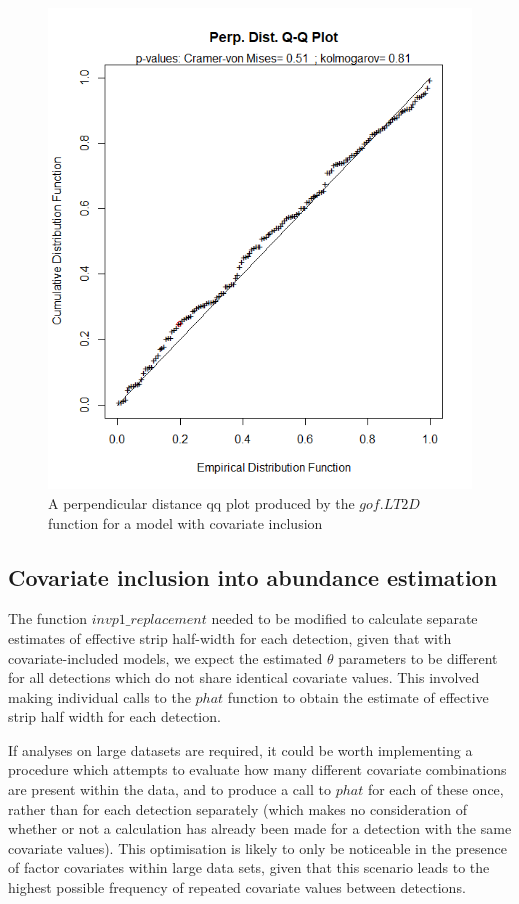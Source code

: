 \documentclass[11pt]{article}
\begin{document}
\begin{multicols}{2}
\begin{figure}[H]
\center
\includegraphics[scale=0.57]{gofx}
\caption{A perpendicular distance qq plot produced by the $gof.LT2D$ function for a model with covariate inclusion}
\end{figure}


\subsection{Covariate inclusion into abundance estimation}
The function $invp1\_replacement$ needed to be modified to calculate separate estimates of effective strip half-width for each detection, given that with covariate-included models, we expect the estimated $\theta$ parameters to be different for all detections which do not share identical covariate values. This involved making individual calls to the $phat$ function to obtain the estimate of effective strip half width for each detection.

If analyses on large datasets are required, it could be worth implementing a procedure which attempts to evaluate how many different covariate combinations are present within the data, and to produce a call to $phat$ for each of these once, rather than for each detection separately (which makes no consideration of whether or not a calculation has already been made for a detection with the same covariate values). This optimisation is likely to only be noticeable in the presence of factor covariates within large data sets, given that this scenario leads to the highest possible frequency of repeated covariate values between detections.



\end{multicols}
\end{document}
